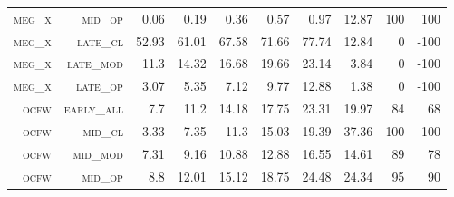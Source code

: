 \begin{landscape}
\begin{table}[!htbp]
\begin{tabular}{@{}rrrrrrr|rrr@{}}
\footnotesize \textsc{meg\_x}      & \footnotesize \textsc{mid\_op   }      & \footnotesize 0.06           & \footnotesize 0.19             & \footnotesize 0.36      & \footnotesize 0.57            & \footnotesize 0.97       & \footnotesize 12.87    & \footnotesize 100   & \footnotesize 100      \\
\footnotesize \textsc{meg\_x}      & \footnotesize \textsc{late\_cl  }      & \footnotesize 52.93          & \footnotesize 61.01            & \footnotesize 67.58     & \footnotesize 71.66           & \footnotesize 77.74      & \footnotesize 12.84    & \footnotesize 0     & \footnotesize -100      \\
\footnotesize \textsc{meg\_x}      & \footnotesize \textsc{late\_mod }      & \footnotesize 11.3           & \footnotesize 14.32            & \footnotesize 16.68     & \footnotesize 19.66           & \footnotesize 23.14      & \footnotesize 3.84     & \footnotesize 0     & \footnotesize -100      \\
\footnotesize \textsc{meg\_x}      & \footnotesize \textsc{late\_op  }      & \footnotesize 3.07           & \footnotesize 5.35             & \footnotesize 7.12      & \footnotesize 9.77            & \footnotesize 12.88      & \footnotesize 1.38     & \footnotesize 0     & \footnotesize -100      \\
\footnotesize \textsc{ocfw}        & \footnotesize \textsc{early\_all}      & \footnotesize 7.7            & \footnotesize 11.2             & \footnotesize 14.18     & \footnotesize 17.75           & \footnotesize 23.31      & \footnotesize 19.97    & \footnotesize 84    & \footnotesize 68      \\
\footnotesize \textsc{ocfw}        & \footnotesize \textsc{mid\_cl   }      & \footnotesize 3.33           & \footnotesize 7.35             & \footnotesize 11.3      & \footnotesize 15.03           & \footnotesize 19.39      & \footnotesize 37.36    & \footnotesize 100   & \footnotesize 100      \\
\footnotesize \textsc{ocfw}        & \footnotesize \textsc{mid\_mod  }      & \footnotesize 7.31           & \footnotesize 9.16             & \footnotesize 10.88     & \footnotesize 12.88           & \footnotesize 16.55      & \footnotesize 14.61    & \footnotesize 89    & \footnotesize 78      \\
\footnotesize \textsc{ocfw}        & \footnotesize \textsc{mid\_op   }      & \footnotesize 8.8            & \footnotesize 12.01            & \footnotesize 15.12     & \footnotesize 18.75           & \footnotesize 24.48      & \footnotesize 24.34    & \footnotesize 95    & \footnotesize 90       \\

\end{tabular}
\end{table}
\end{landscape}
